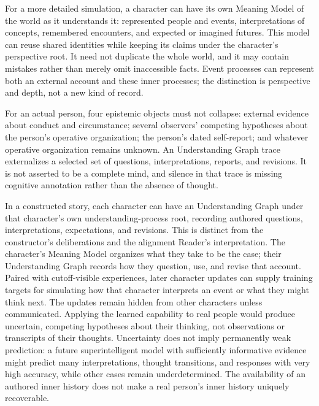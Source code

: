 \documentclass[10pt]{article}
\begin{document}
For a more detailed simulation, a character can have its own Meaning Model of
the world as it understands it: represented people and events, interpretations
of concepts, remembered encounters, and expected or imagined futures. This
model can reuse shared identities while keeping its claims under the
character's perspective root. It need not duplicate the whole world, and it
may contain mistakes rather than merely omit inaccessible facts. Event
processes can represent both an external account and these inner processes;
the distinction is perspective and depth, not a new kind of record.

For an actual person, four epistemic objects must not collapse: external
evidence about conduct and circumstance; several observers' competing
hypotheses about the person's operative organization; the person's dated
self-report; and whatever operative organization remains unknown. An
Understanding Graph trace externalizes a selected set of questions,
interpretations, reports, and revisions. It is not asserted to be a complete
mind, and silence in that trace is missing cognitive annotation rather than the
absence of thought.

In a constructed story, each character can have an Understanding Graph under
that character's own understanding-process root, recording authored questions,
interpretations, expectations, and revisions. This is distinct from the
constructor's deliberations and the alignment Reader's interpretation.
The character's Meaning Model organizes what they take to be the case; their
Understanding Graph records how they question, use, and revise that account.
Paired with cutoff-visible experiences, later character updates can supply
training targets for simulating how that character interprets an event or what
they might think next. The updates remain hidden from other characters unless
communicated. Applying the learned capability to real people would produce
uncertain, competing hypotheses about their thinking, not observations or
transcripts of their thoughts. Uncertainty does not imply permanently weak
prediction: a future superintelligent model with sufficiently informative
evidence might predict many interpretations, thought transitions, and responses
with very high accuracy, while other cases remain underdetermined.
The availability of an authored inner history
does not make a real person's inner history uniquely recoverable.
\end{document}

